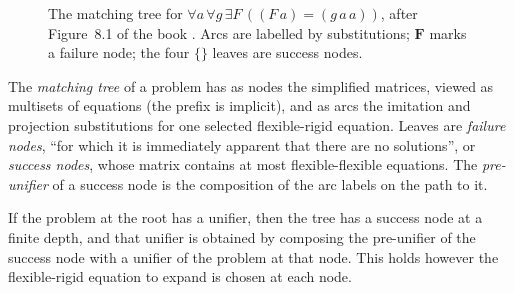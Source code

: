 \begin{figure}[t]
\centering
{}
\caption{The matching tree for \mbox{$\forall a\,\forall g\,\exists F\,((F\,a)=(g\,a\,a))$}, after Figure~8.1 of the book
. Arcs are labelled by substitutions; $\mathbf{F}$ marks a failure node; the four $\{\}$ leaves are
success nodes.}
\label{fig:hounif-tree}
\end{figure}

\begin{definition}\label{def:hounif-tree}
The \emph{matching tree} of a problem has as nodes the simplified matrices, viewed as multisets of equations
(the prefix is implicit), and as arcs the imitation and projection substitutions for one selected
flexible-rigid equation. Leaves are \emph{failure nodes}, \enquote{for which it is immediately apparent that there
are no solutions}, or \emph{success nodes}, whose matrix contains at most flexible-flexible equations. The
\emph{pre-unifier} of a success node is the composition of the arc labels on the path to it.
\end{definition}

\begin{theorem}\label{thm:hounif-tree}
If the problem at the root has a unifier, then the tree has a success node at a finite depth, and that unifier
is obtained by composing the pre-unifier of the success node with a unifier of the problem at that node. This
holds however the flexible-rigid equation to expand is chosen at each node.
\end{theorem}

